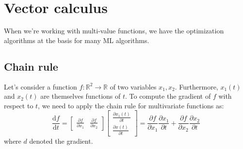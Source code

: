 \documentclass[11pt]{article}
\begin{document}
\section{Vector calculus}
When we're working with multi-value functions, we have the optimization algorithms at the basis for many ML algorithms. 
\subsection{Chain rule}
Let's consider a function $f: \mathbb{R}^{2} \rightarrow \mathbb{R}$ of two variables $x_1, x_2$. Furthermore, $x_1(t)$ and $x_2(t)$ are themselves functions of $t$. To compute the gradient of $f$ with respect to $t$, we need to apply the chain rule for multivariate functions as:
\begin{displaymath}
    \frac{\mathrm{d} f}{\mathrm{d} t}=\left[\begin{array}{ll}
        \frac{\partial f}{\partial x_{1}} & \frac{\partial f}{\partial x_{2}}
        \end{array}\right]\left[\begin{array}{l}
        \frac{\partial x_{1}(t)}{\partial t} \\
        \frac{\partial x(t)}{\partial t}
        \end{array}\right]=\frac{\partial f}{\partial x_{1}} \frac{\partial x_{1}}{\partial t}+\frac{\partial f}{\partial x_{2}} \frac{\partial x_{2}}{\partial t}
\end{displaymath}
where $d$ denoted the gradient.
\end{document}
